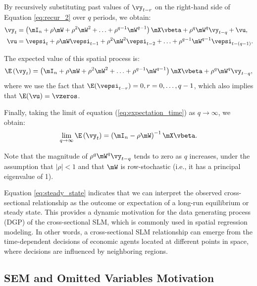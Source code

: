 \documentclass[english,12pt]{book}\usepackage[]{graphicx}\usepackage[]{xcolor}
\begin{document}
By recursively substituting past values of $\vy_{t-r}$ on the right-hand side of Equation \eqref{eq:recur_2} over $q$ periods, we obtain:
\begin{equation*}
  \begin{aligned}
    \vy_t &= \left(\mI_n + \rho\mW + \rho^2\mW^2 + \ldots + \rho^{q-1}\mW^{q-1}\right)\mX\vbeta + \rho^q\mW^q\vy_{t-q} + \vu,\\
    \vu  & = \vepsi_{t} + \rho\mW\vepsi_{t-1} + \rho^2\mW^2\vepsi_{t-2} + \ldots + \rho^{q-1}\mW^{q-1}\vepsi_{t - (q-1)}. 
  \end{aligned}
\end{equation*}

The expected value of this spatial process is:
\begin{equation}\label{eq:expectation_time}
  \E\left(\vy_t\right) = \left(\mI_n + \rho\mW + \rho^2\mW^2 + \ldots + \rho^{q-1}\mW^{q-1}\right)\mX\vbeta + \rho^q\mW^q\vy_{t-q},
\end{equation}
%
where we use the fact that $\E(\vepsi_{t-r}) = 0, r = 0, \ldots, q-1$, which also implies that $\E(\vu) = \vzeros$. 

Finally, taking the limit of equation (\ref{eq:expectation_time}) as $q \to \infty$, we obtain:
\begin{equation}\label{eq:steady_state}
\lim_{q\to \infty} \E\left(\vy_t\right) = \left(\mI_n - \rho\mW\right)^{-1}\mX\vbeta.
\end{equation}

Note that the magnitude of $\rho^q\mW^q\vy_{t-q}$ tends to zero as $q$ increases, under the assumption that $\lvert \rho \rvert < 1$ and that $\mW$ is row-stochastic (i.e., it has a principal eigenvalue of 1).

Equation \eqref{eq:steady_state} indicates that we can interpret the observed cross-sectional relationship as the outcome or expectation of a long-run equilibrium or steady state. This provides a dynamic motivation for the data generating process (DGP) of the cross-sectional SLM, which is commonly used in spatial regression modeling. In other words, a cross-sectional SLM relationship can emerge from the time-dependent decisions of economic agents located at different points in space, where decisions are influenced by neighboring regions.


\subsection{SEM and Omitted Variables Motivation}
\end{document}
